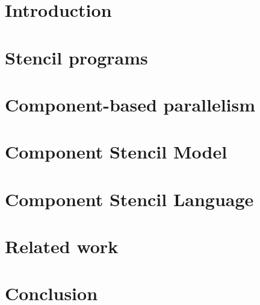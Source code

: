 \documentclass[twoside]{article}
\begin{document}
\makeRR   %
\section{Introduction}
\label{sect:introduction}
\section{Stencil programs}
\label{sect:formalism}

\section{Component-based parallelism}
\label{sect:component}

\section{Component Stencil Model}
\label{sect:csm}

\section{Component Stencil Language}
\label{sect:csl}

\section{Related work}
\label{sect:rel}
\section{Conclusion}
\label{sect:concl}
\label{sect:bib}



\tableofcontents
\end{document}

